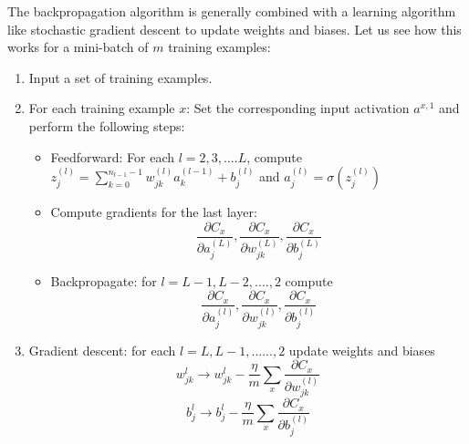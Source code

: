 The backpropagation algorithm is generally combined with a learning algorithm like stochastic gradient descent to update weights and biases. Let us see how this works for a mini-batch of $m$ training examples:
\begin{enumerate}
    \item Input a set of training examples. 
    \item For each training example $x$: Set the corresponding input activation $a^{x,1}$ and perform the following steps:
    \begin{itemize}
        \item Feedforward: For each $l = 2,3,....L$, compute $z_j^{(l)} = \sum_{k=0}^{n_{l-1} -1} w_{jk}^{(l)} a_k^{(l-1)} + b_j^{(l)}$ and $a_j^{(l)} = \sigma (z_j^{(l)})$
        \item Compute gradients for the last layer: $$\frac{\partial C_x}{\partial a_j^{(L)}}, \frac{\partial C_x}{\partial w_{jk}^{(L)}}, \frac{\partial C_x}{\partial b_j^{(L)}}$$
        \item Backpropagate: for $l = L-1, L-2, ...., 2$ compute $$\frac{\partial C_x}{\partial a_j^{(l)}}, \frac{\partial C_x}{\partial w_{jk}^{(l)}}, \frac{\partial C_x}{\partial b_j^{(l)}}$$
    \end{itemize}
    \item Gradient descent: for each $l = L, L-1, ......, 2$ update weights and biases
        $$w_{jk}^l \rightarrow w_{jk}^l - \frac{\eta}{m} \sum_x \frac{\partial C_x}{\partial w_{jk}^{(l)}} $$
        $$b_j^l \rightarrow b_j^l - \frac{\eta}{m} \sum_x \frac{\partial C_x}{\partial b_j^{(l)}} $$
\end{enumerate}
